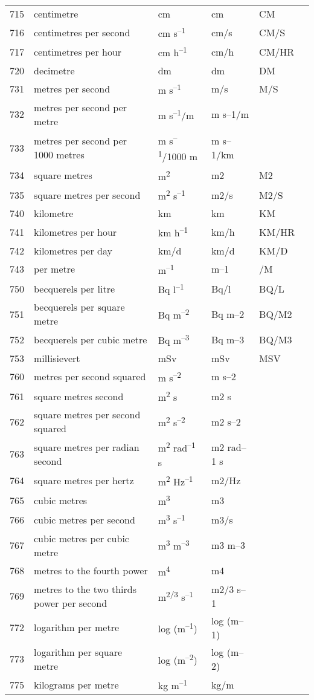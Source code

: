 \begin{longtable}[]{@{}llllll@{}}
715 & centimetre & cm & cm & CM &\tabularnewline
716 & centimetres per second & cm s\textsuperscript{--1} & cm/s & CM/S &\tabularnewline
717 & centimetres per hour & cm h\textsuperscript{--1} & cm/h & CM/HR &\tabularnewline
720 & decimetre & dm & dm & DM &\tabularnewline
731 & metres per second & m s\textsuperscript{--1} & m/s & M/S &\tabularnewline
732 & metres per second per metre & m s\textsuperscript{--1}/m & m s--1/m & &\tabularnewline
733 & metres per second per 1000 metres & m s\textsuperscript{--1}/1000 m & m s--1/km & &\tabularnewline
734 & square metres & m\textsuperscript{2} & m2 & M2 &\tabularnewline
735 & square metres per second & m\textsuperscript{2} s\textsuperscript{--1} & m2/s & M2/S &\tabularnewline
740 & kilometre & km & km & KM &\tabularnewline
741 & kilometres per hour & km h\textsuperscript{--1} & km/h & KM/HR &\tabularnewline
742 & kilometres per day & km/d & km/d & KM/D &\tabularnewline
743 & per metre & m\textsuperscript{--1} & m--1 & /M &\tabularnewline
750 & becquerels per litre & Bq l\textsuperscript{--1} & Bq/l & BQ/L &\tabularnewline
751 & becquerels per square metre & Bq m\textsuperscript{--2} & Bq m--2 & BQ/M2 &\tabularnewline
752 & becquerels per cubic metre & Bq m\textsuperscript{--3} & Bq m--3 & BQ/M3 &\tabularnewline
753 & millisievert & mSv & mSv & MSV &\tabularnewline
760 & metres per second squared & m s\textsuperscript{--2} & m s--2 & &\tabularnewline
761 & square metres second & m\textsuperscript{2} s & m2 s & &\tabularnewline
762 & square metres per second squared & m\textsuperscript{2} s\textsuperscript{--2} & m2 s--2 & &\tabularnewline
763 & square metres per radian second & m\textsuperscript{2} rad\textsuperscript{--1} s & m2 rad--1 s & &\tabularnewline
764 & square metres per hertz & m\textsuperscript{2} Hz\textsuperscript{--1} & m2/Hz & &\tabularnewline
765 & cubic metres & m\textsuperscript{3} & m3 & &\tabularnewline
766 & cubic metres per second & m\textsuperscript{3} s\textsuperscript{--1} & m3/s & &\tabularnewline
767 & cubic metres per cubic metre & m\textsuperscript{3} m\textsuperscript{--3} & m3 m--3 & &\tabularnewline
768 & metres to the fourth power & m\textsuperscript{4} & m4 & &\tabularnewline
769 & metres to the two thirds power per second & m\textsuperscript{2/3} s\textsuperscript{--1} & m2/3 s--1 & &\tabularnewline
772 & logarithm per metre & log (m\textsuperscript{--1}) & log (m--1) & &\tabularnewline
773 & logarithm per square metre & log (m\textsuperscript{--2}) & log (m--2) & &\tabularnewline
775 & kilograms per metre & kg m\textsuperscript{--1} & kg/m & &\tabularnewline
\bottomrule
\end{longtable}

